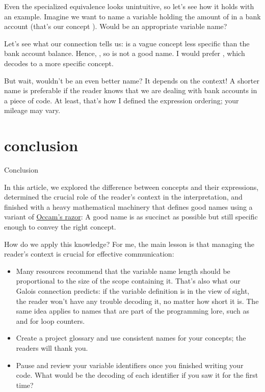 \documentclass{article}
\begin{document}
Even the specialized equivalence looks unintuitive, so let's see how it holds with an example.
Imagine we want to name a variable holding the amount of  in a bank account (that's our concept ).
Would  be an appropriate variable name?

Let's see what our connection tells us:  is a vague concept less specific than the bank account balance.
Hence, , so  is not a good name.
I would prefer , which decodes to a more specific concept.

But wait, wouldn't  be an even better name?
It depends on the context!
A shorter name is preferable if the reader knows that we are dealing with bank accounts in a piece of code.
At least, that's how I defined the expression ordering; your mileage may vary.

\section{conclusion}{Conclusion}

In this article, we explored the difference between concepts and their expressions,
determined the crucial role of the reader's context in the interpretation,
and finished with a heavy mathematical machinery that defines good names using a variant of \href{https://en.wikipedia.org/wiki/Occam's_razor}{Occam's razor}:
A good name is as succinct as possible but still specific enough to convey the right concept.

How do we apply this knowledge?
For me, the main lesson is that managing the reader's context is crucial for effective communication:

\begin{itemize}
\item
  Many resources recommend that the variable name length should be proportional to the size of the scope containing it.
  That's also what our Galois connection predicts: if the variable definition is in the view of sight, the reader won't have any trouble decoding it, no matter how short it is.
  The same idea applies to names that are part of the programming lore, such as  and  for loop counters.
\item
  Create a project glossary and use consistent names for your concepts; the readers will thank you.
\item
  Pause and review your variable identifiers once you finished writing your code.
  What would be the decoding of each identifier if you saw it for the first time?
\end{itemize}
\end{document}
